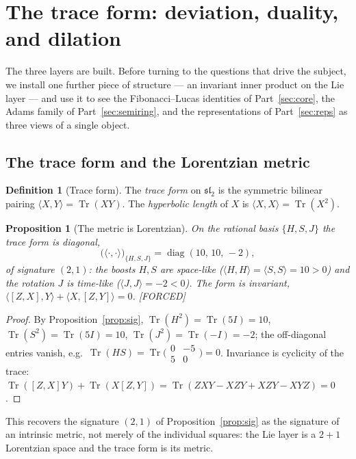 \documentclass[11pt]{article}
\theoremstyle{plain}
\newtheorem{proposition}[theorem]{Proposition}
\theoremstyle{definition}
\newtheorem{definition}[theorem]{Definition}
\theoremstyle{remark}
\newcommand{\Forced}{\textcolor{forcedc}{[FORCED]}}
\newcommand{\Tr}{\operatorname{Tr}}
\begin{document}
\section{The trace form: deviation, duality, and dilation}\label{sec:traceform}

The three layers are built. Before turning to the questions that drive the subject, we install one further piece of structure --- an invariant inner product on the Lie layer --- and use it to see the Fibonacci--Lucas identities of Part~\ref{sec:core}, the Adams family of Part~\ref{sec:semiring}, and the representations of Part~\ref{sec:reps} as three views of a single object.

\subsection{The trace form and the Lorentzian metric}

\begin{definition}[Trace form]\label{def:traceform}
The \emph{trace form} on $𝔰𝔩_2$ is the symmetric bilinear pairing $⟨X,Y⟩=\Tr(XY)$. The \emph{hyperbolic length} of $X$ is $⟨X,X⟩=\Tr(X^{2})$.
\end{definition}

\begin{proposition}[The metric is Lorentzian]\label{prop:metric}
On the rational basis $\{H,S,J\}$ the trace form is diagonal,
\[
\bigl(⟨\cdot,\cdot⟩\bigr)_{\{H,S,J\}}=\operatorname{diag}(10,\,10,\,-2),
\]
of signature $(2,1)$: the boosts $H,S$ are space-like ($⟨H,H⟩=⟨S,S⟩=10>0$) and the rotation $J$ is time-like ($⟨J,J⟩=-2<0$). The form is invariant, $⟨[Z,X],Y⟩+⟨X,[Z,Y]⟩=0$. \Forced
\end{proposition}
\begin{proof}
By Proposition~\ref{prop:sig}, $\Tr(H^{2})=\Tr(5I)=10$, $\Tr(S^{2})=\Tr(5I)=10$, $\Tr(J^{2})=\Tr(-I)=-2$; the off-diagonal entries vanish, e.g.\ $\Tr(HS)=\Tr\bigl(\begin{smallmatrix}0&-5\\5&0\end{smallmatrix}\bigr)=0$. Invariance is cyclicity of the trace: $\Tr([Z,X]Y)+\Tr(X[Z,Y])=\Tr(ZXY-XZY+XZY-XYZ)=0$.
\end{proof}

This recovers the signature $(2,1)$ of Proposition~\ref{prop:sig} as the signature of an intrinsic metric, not merely of the individual squares: the Lie layer is a $2{+}1$ Lorentzian space and the trace form is its metric.
\end{document}
